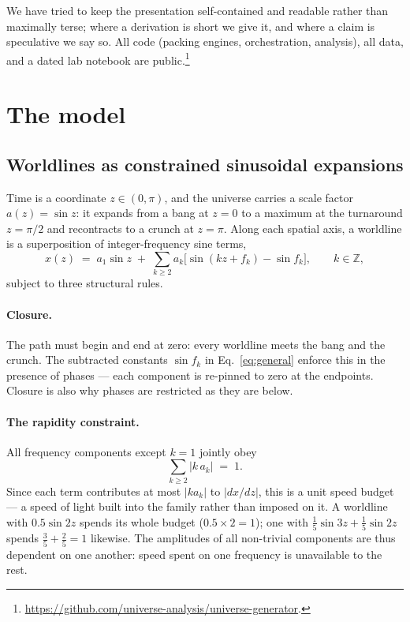 \documentclass[11pt]{article}
\begin{document}
We have tried to keep the presentation self-contained and readable rather
than maximally terse; where a derivation is short we give it, and where a
claim is speculative we say so. All code (packing engines, orchestration,
analysis), all data, and a dated lab notebook are public.\footnote{%
\url{https://github.com/universe-analysis/universe-generator}.}

\section{The model}
\label{sec:model}

\subsection{Worldlines as constrained sinusoidal expansions}
\label{sec:worldlines}

Time is a coordinate $z \in (0,\pi)$, and the universe carries a scale factor
$a(z) = \sin z$: it expands from a bang at $z = 0$ to a maximum at the
turnaround $z = \pi/2$ and recontracts to a crunch at $z = \pi$. Along each
spatial axis, a worldline is a superposition of integer-frequency sine terms,
\begin{equation}
  x(z) \;=\; a_1 \sin z \;+\; \sum_{k \ge 2} a_k
  \bigl[\sin(kz + f_k) - \sin f_k\bigr],
  \qquad k \in \mathbb{Z},
  \label{eq:general}
\end{equation}
subject to three structural rules.

\paragraph{Closure.} The path must begin and end at zero: every worldline
meets the bang and the crunch. The subtracted constants $\sin f_k$ in
Eq.~\eqref{eq:general} enforce this in the presence of phases --- each
component is re-pinned to zero at the endpoints. Closure is also why phases
are restricted as they are below.

\paragraph{The rapidity constraint.} All frequency components except $k=1$
jointly obey
\begin{equation}
  \sum_{k \ge 2} |k\, a_k| \;=\; 1 .
  \label{eq:rapidity}
\end{equation}
Since each term contributes at most $|k a_k|$ to $|dx/dz|$, this is a unit
speed budget --- a speed of light built into the family rather than imposed
on it. A worldline with $0.5\sin 2z$ spends its whole budget
($0.5 \times 2 = 1$); one with $\tfrac{1}{5}\sin 3z + \tfrac{1}{5}\sin 2z$
spends $\tfrac{3}{5} + \tfrac{2}{5} = 1$ likewise. The amplitudes of all
non-trivial components are thus dependent on one another: speed spent on one
frequency is unavailable to the rest.
\end{document}
